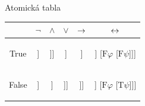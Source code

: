 \documentclass{beamer}
\begin{document}
\begin{frame}{Atomická tabla}

        \begin{tabular}{@{}c||c|c|c|c|c@{}}
         & $\neg$ & $\land$ & $\lor$ & $\mathbin{\rightarrow}$ & $\mathbin{\leftrightarrow}$  \\ \midrule \midrule
        True
        &  
        \begin{forest}
        [$\mathrm{T}\neg\varphi$ [$\mathrm{F}\varphi$]]
        \end{forest}
        &  
        \begin{forest}
        [$\mathrm{T}\varphi\land\psi$ [$\mathrm{T}\varphi$ [$\mathrm{T}\psi$]]]
        \end{forest}
        & 
        \begin{forest}
        [$\mathrm{T}\varphi\lor\psi$ [$\mathrm{T}\varphi$] [$\mathrm{T}\psi$]]
        \end{forest}
        &
        \begin{forest}
        [$\mathrm{T}\varphi\limplies\psi$ [$\mathrm{F}\varphi$] [$\mathrm{T}\psi$]]
        \end{forest}
        &  
        \begin{forest}
        [$\mathrm{T}\varphi\liff\psi$ [$\mathrm{T}\varphi$ [$\mathrm{T}\psi$]] [$\mathrm{F}\varphi$ [$\mathrm{F}\psi$]]]
        \end{forest}
        \\ \midrule
        False 
        & 
        \begin{forest}
        [$\mathrm{F}\neg\varphi$ [$\mathrm{T}\varphi$]]
        \end{forest}
        &
        \begin{forest}
        [$\mathrm{F}\varphi\land\psi$ [$\mathrm{F}\varphi$] [$\mathrm{F}\psi$]]
        \end{forest}
        &
        \begin{forest}
        [$\mathrm{F}\varphi\lor\psi$ [$\mathrm{F}\varphi$ [$\mathrm{F}\psi$]]]
        \end{forest}
        &
        \begin{forest}
        [$\mathrm{F}\varphi\limplies\psi$ [$\mathrm{T}\varphi$ [$\mathrm{F}\psi$]]]
        \end{forest}
        &
        \begin{forest}
        [$\mathrm{F}\varphi\liff\psi$ [$\mathrm{T}\varphi$ [$\mathrm{F}\psi$]] [$\mathrm{F}\varphi$ [$\mathrm{T}\psi$]]]
        \end{forest}
        \end{tabular}
    
\end{frame}
\end{document}
